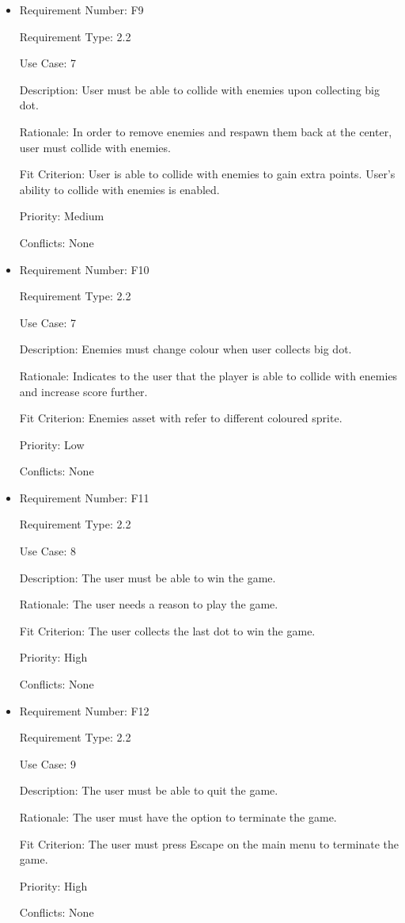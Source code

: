 \documentclass[12pt, titlepage]{article}
\begin{document}
\begin{itemize}
\item
Requirement Number: F9

Requirement Type: 2.2

Use Case: 7

Description: User must be able to collide with enemies upon collecting big dot.

Rationale: In order to remove enemies and respawn them back at the center, user must collide with enemies.

Fit Criterion: User is able to collide with enemies to gain extra points. User's ability to collide with enemies is enabled.

Priority: Medium

Conflicts: None
\end{itemize}

\begin{itemize}
\item
Requirement Number: F10

Requirement Type: 2.2

Use Case: 7

Description: Enemies must change colour when user collects big dot.

Rationale: Indicates to the user that the player is able to collide with enemies and increase score further.

Fit Criterion: Enemies asset with refer to different coloured sprite.

Priority: Low

Conflicts: None
\end{itemize}

\begin{itemize}
\item
Requirement Number: F11

Requirement Type: 2.2

Use Case: 8

Description: The user must be able to win the game.

Rationale: The user needs a reason to play the game.

Fit Criterion: The user collects the last dot to win the game.

Priority: High

Conflicts: None
\end{itemize}

\begin{itemize}
\item
Requirement Number: F12

Requirement Type: 2.2

Use Case: 9

Description: The user must be able to quit the game.

Rationale: The user must have the option to terminate the game.

Fit Criterion: The user must press Escape on the main menu to terminate the game.

Priority: High

Conflicts: None
\end{itemize}
\end{document}
